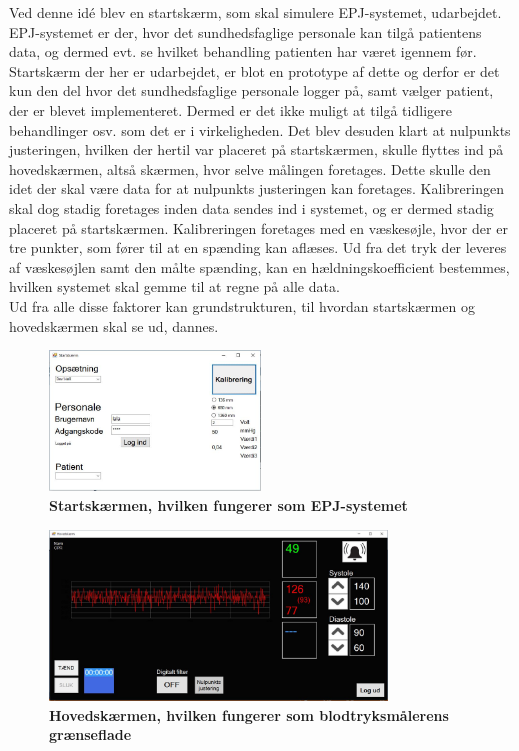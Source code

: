 Ved denne idé blev en startskærm, som skal simulere EPJ-systemet, udarbejdet. EPJ-systemet er der, hvor det sundhedsfaglige personale kan tilgå patientens data, og dermed evt. se hvilket behandling patienten har været igennem før. Startskærm der her er udarbejdet, er blot en prototype af dette og derfor er det kun den del hvor det sundhedsfaglige personale logger på, samt vælger patient, der er blevet implementeret. Dermed er det ikke muligt at tilgå tidligere behandlinger osv. som det er i virkeligheden. Det blev desuden klart at nulpunkts justeringen, hvilken der hertil var placeret på startskærmen, skulle flyttes ind på hovedskærmen, altså skærmen, hvor selve målingen foretages. Dette skulle den idet der skal være data for at nulpunkts justeringen kan foretages. Kalibreringen skal dog stadig foretages inden data sendes ind i systemet, og er dermed stadig placeret på startskærmen. Kalibreringen foretages med en væskesøjle, hvor der er tre punkter, som fører til at en spænding kan aflæses. Ud fra det tryk der leveres af væskesøjlen samt den målte spænding, kan en hældningskoefficient bestemmes, hvilken systemet skal gemme til at regne på alle data.\\
Ud fra alle disse faktorer kan grundstrukturen, til hvordan startskærmen og hovedskærmen skal se ud, dannes.
\begin{figure}[H]
\includegraphics[width =0.5\textwidth , center]{billeder/SkitseStartNy}
\caption{\textbf{Startskærmen, hvilken fungerer som EPJ-systemet}}
\end{figure}
\begin{figure}[H]
\includegraphics[width =0.8\textwidth , center]{billeder/SkitseHovedNy}
\caption{\textbf{Hovedskærmen, hvilken fungerer som blodtryksmålerens grænseflade}}
\end{figure}

